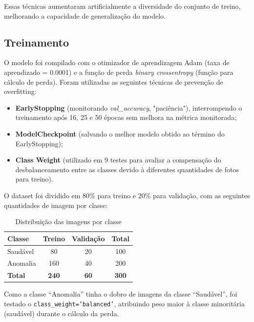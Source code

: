 \documentclass[11pt,a4paper]{article}
\begin{document}
Essas técnicas aumentaram artificialmente a diversidade do conjunto de treino, melhorando a capacidade de generalização do modelo.

\subsection{Treinamento}

O modelo foi compilado com o otimizador de aprendizagem Adam (taxa de aprendizado = 0.0001) e a função de perda \textit{binary crossentropy} (função para cálculo de perda). Foram utilizadas as seguintes técnicas de prevenção de overfitting:

\begin{itemize}
    \item \textbf{EarlyStopping} (monitorando \textit{val\_accuracy}, "paciência"), interrompendo o treinamento após 16, 25 e 50 épocas sem melhora na métrica monitorada;
    \item \textbf{ModelCheckpoint} (salvando o melhor modelo obtido ao término do EarlyStopping);
    \item \textbf{Class Weight} (utilizado em 9 testes para avaliar a compensação do desbalanceamento entre as classes devido à diferentes quantidades de fotos para treino).
\end{itemize}

O dataset foi dividido em 80\% para treino e 20\% para validação, com as seguintes quantidades de imagem por classe:

\begin{table}[ht]
\centering
\caption{Distribuição das imagens por classe}
\label{tab:distribuicao-imagens}
\begin{tabular}{lccc}
\hline
\textbf{Classe}   & \textbf{Treino} & \textbf{Validação} & \textbf{Total} \\ \hline
Saudável          & 80              & 20                 & 100            \\
Anomalia          & 160             & 40                 & 200            \\ \hline
\textbf{Total}    & \textbf{240}    & \textbf{60}        & \textbf{300}   \\ \hline
\end{tabular}
\end{table}

Como a classe ``Anomalia'' tinha o dobro de imagens da classe ``Saudável'', foi testado o \texttt{class\_weight='balanced'}, atribuindo peso maior à classe minoritária (saudável) durante o cálculo da perda.
\end{document}
